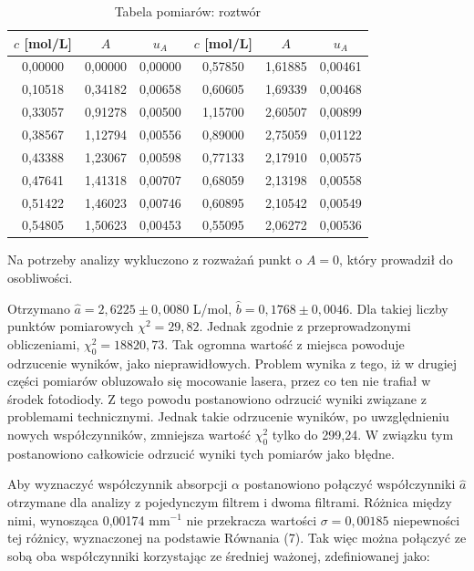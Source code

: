 \documentclass[10pt,a4paper]{article}
\begin{document}
 \begin{table}[h!]
\centering
\caption{Tabela pomiarów: roztwór}
\label{t9}
\begin{tabular}{|c|c|c||c|c|c|}
\hline
$c$ [mol/L] & $A$     & $u_{A}$ & $c$ [mol/L] & $A$     & $u_{A}$ \\ \hline
0,00000     & 0,00000 & 0,00000 & 0,57850     & 1,61885 & 0,00461 \\ \hline
0,10518     & 0,34182 & 0,00658 & 0,60605     & 1,69339 & 0,00468 \\ \hline
0,33057     & 0,91278 & 0,00500 & 1,15700     & 2,60507 & 0,00899 \\ \hline
0,38567     & 1,12794 & 0,00556 & 0,89000     & 2,75059 & 0,01122 \\ \hline
0,43388     & 1,23067 & 0,00598 & 0,77133     & 2,17910 & 0,00575 \\ \hline
0,47641     & 1,41318 & 0,00707 & 0,68059     & 2,13198 & 0,00558 \\ \hline
0,51422     & 1,46023 & 0,00746 & 0,60895     & 2,10542 & 0,00549 \\ \hline
0,54805     & 1,50623 & 0,00453 & 0,55095     & 2,06272 & 0,00536 \\ \hline
\end{tabular}
\end{table}
Na potrzeby analizy wykluczono z rozważań punkt o $A=0$, który prowadził do osobliwości. 

Otrzymano $\hat{a}=2,6225\pm0,0080$ L/mol, $\hat{b}=0,1768\pm0,0046$.
Dla takiej liczby punktów pomiarowych $\chi^2= 29,82$. Jednak zgodnie z przeprowadzonymi obliczeniami, $\chi_{0}^2=18820,73$. Tak ogromna wartość z miejsca powoduje odrzucenie wyników, jako nieprawidłowych. Problem wynika z tego, iż w drugiej części pomiarów obluzowało się mocowanie lasera, przez co ten nie trafiał w środek fotodiody. Z tego powodu postanowiono odrzucić wyniki związane z problemami technicznymi. Jednak takie odrzucenie wyników, po uwzględnieniu nowych współczynników, zmniejsza wartość $\chi^2_{0}$ tylko do 299,24. W związku tym postanowiono całkowicie odrzucić wyniki tych pomiarów jako błędne.

Aby wyznaczyć współczynnik absorpcji $\alpha$ postanowiono połączyć współczynniki $\hat{a}$ otrzymane dla analizy z pojedynczym filtrem i dwoma filtrami. Różnica między nimi, wynosząca 0,00174 mm$^{-1}$ nie przekracza wartości $\sigma=0,00185$ niepewności tej różnicy, wyznaczonej na podstawie Równania (7). Tak więc można połączyć ze sobą oba współczynniki korzystając ze średniej ważonej, zdefiniowanej jako:
\end{document}
